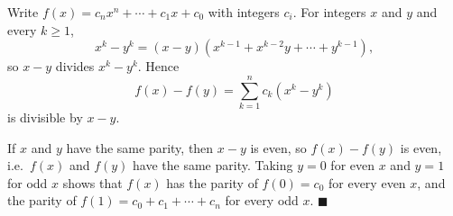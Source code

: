 Write $f(x)=c_nx^n+\cdots+c_1x+c_0$ with integers $c_i$. For integers $x$ and $y$ and every $k\ge1$,
\[
x^k-y^k=(x-y)\left(x^{k-1}+x^{k-2}y+\cdots+y^{k-1}\right),
\]
so $x-y$ divides $x^k-y^k$. Hence
\[
f(x)-f(y)=\sum_{k=1}^{n}c_k\left(x^k-y^k\right)
\]
is divisible by $x-y$.

If $x$ and $y$ have the same parity, then $x-y$ is even, so $f(x)-f(y)$ is even, i.e.\ $f(x)$ and $f(y)$ have the same parity. Taking $y=0$ for even $x$ and $y=1$ for odd $x$ shows that $f(x)$ has the parity of $f(0)=c_0$ for every even $x$, and the parity of $f(1)=c_0+c_1+\cdots+c_n$ for every odd $x$. $\blacksquare$
